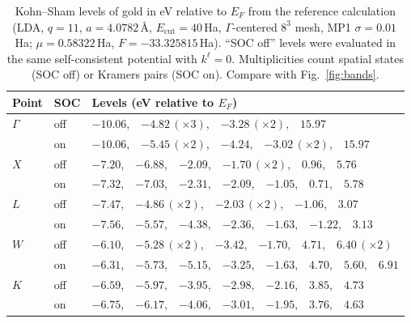 \begin{table}[tbp]
\centering\small
\begin{tabular}{@{}lll@{}}
\toprule
Point & SOC & Levels (eV relative to $E_F$)\\
\midrule
$\Gamma$ & off & $-10.06$,\ \ $-4.82\,(\times3)$,\ \ $-3.28\,(\times2)$,\ \ $15.97$\\
         & on  & $-10.06$,\ \ $-5.45\,(\times2)$,\ \ $-4.24$,\ \ $-3.02\,(\times2)$,\ \ $15.97$\\
\midrule
$X$ & off & $-7.20$,\ \ $-6.88$,\ \ $-2.09$,\ \ $-1.70\,(\times2)$,\ \ $0.96$,\ \ $5.76$\\
    & on  & $-7.32$,\ \ $-7.03$,\ \ $-2.31$,\ \ $-2.09$,\ \ $-1.05$,\ \ $0.71$,\ \ $5.78$\\
\midrule
$L$ & off & $-7.47$,\ \ $-4.86\,(\times2)$,\ \ $-2.03\,(\times2)$,\ \ $-1.06$,\ \ $3.07$\\
    & on  & $-7.56$,\ \ $-5.57$,\ \ $-4.38$,\ \ $-2.36$,\ \ $-1.63$,\ \ $-1.22$,\ \ $3.13$\\
\midrule
$W$ & off & $-6.10$,\ \ $-5.28\,(\times2)$,\ \ $-3.42$,\ \ $-1.70$,\ \ $4.71$,\ \ $6.40\,(\times2)$\\
    & on  & $-6.31$,\ \ $-5.73$,\ \ $-5.15$,\ \ $-3.25$,\ \ $-1.63$,\ \ $4.70$,\ \ $5.60$,\ \ $6.91$\\
\midrule
$K$ & off & $-6.59$,\ \ $-5.97$,\ \ $-3.95$,\ \ $-2.98$,\ \ $-2.16$,\ \ $3.85$,\ \ $4.73$\\
    & on  & $-6.75$,\ \ $-6.17$,\ \ $-4.06$,\ \ $-3.01$,\ \ $-1.95$,\ \ $3.76$,\ \ $4.63$\\
\bottomrule
\end{tabular}
\caption{Kohn--Sham levels of gold in eV relative to $E_F$ from the
reference calculation (LDA, $q=11$, $a = 4.0782$\,\AA,
$E_{\mathrm{cut}} = 40$\,Ha, $\Gamma$-centered $8^3$ mesh, MP1
$\sigma = 0.01$\,Ha; $\mu = 0.58322$\,Ha, $F = -33.325815$\,Ha). ``SOC
off'' levels were evaluated in the same self-consistent potential with
$k^\ell = 0$. Multiplicities count spatial states (SOC off) or Kramers
pairs (SOC on). Compare with Fig.~\ref{fig:bands}.}
\label{tab:goldlevels}
\end{table}

